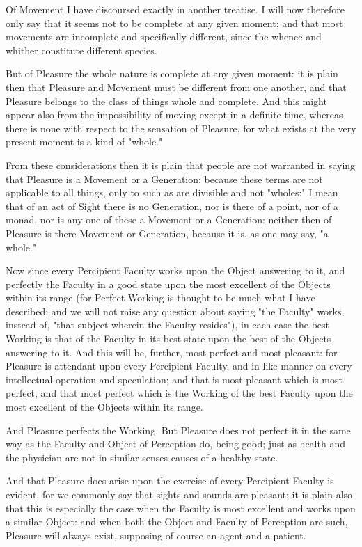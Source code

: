 Of Movement I have discoursed exactly in another treatise. I will now
therefore only say that it seems not to be complete at any given moment;
and that most movements are incomplete and specifically different, since
the whence and whither constitute different species.

But of Pleasure the whole nature is complete at any given moment: it
is plain then that Pleasure and Movement must be different from one
another, and that Pleasure belongs to the class of things whole and
complete. And this might appear also from the impossibility of moving
except in a definite time, whereas there is none with respect to the
sensation of Pleasure, for what exists at the very present moment is a
kind of "whole."

From these considerations then it is plain that people are not warranted
in saying that Pleasure is a Movement or a Generation: because these
terms are not applicable to all things, only to such as are divisible
and not "wholes:" I mean that of an act of Sight there is no Generation,
nor is there of a point, nor of a monad, nor is any one of these a
Movement or a Generation: neither then of Pleasure is there Movement or
Generation, because it is, as one may say, "a whole."

Now since every Percipient Faculty works upon the Object answering to
it, and perfectly the Faculty in a good state upon the most excellent of
the Objects within its range (for Perfect Working is thought to be much
what I have described; and we will not raise any question about saying
"the Faculty" works, instead of, "that subject wherein the Faculty
resides"), in each case the best Working is that of the Faculty in its
best state upon the best of the Objects answering to it. And this will
be, further, most perfect and most pleasant: for Pleasure is attendant
upon every Percipient Faculty, and in like manner on every intellectual
operation and speculation; and that is most pleasant which is most
perfect, and that most perfect which is the Working of the best Faculty
upon the most excellent of the Objects within its range.

And Pleasure perfects the Working. But Pleasure does not perfect it in
the same way as the Faculty and Object of Perception do, being good;
just as health and the physician are not in similar senses causes of a
healthy state.

And that Pleasure does arise upon the exercise of every Percipient
Faculty is evident, for we commonly say that sights and sounds are
pleasant; it is plain also that this is especially the case when the
Faculty is most excellent and works upon a similar Object: and when both
the Object and Faculty of Perception are such, Pleasure will always
exist, supposing of course an agent and a patient.

